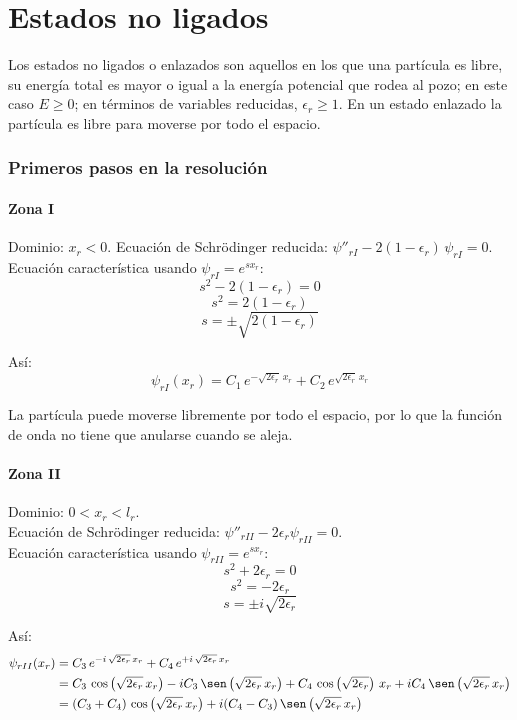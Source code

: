 
\chapter{Estados no ligados}
Los estados no ligados o enlazados son aquellos en los que una partícula
es libre, su energía total es mayor o igual a la energía potencial que rodea
al pozo; en este caso $E\ge 0$; en términos de variables reducidas, $\epsilon_r \ge 1$.
En un estado enlazado la partícula es libre para moverse por todo el espacio.

\subsection{Primeros pasos en la resolución}
\subsubsection{Zona I}
\noindent
Dominio: $x_r < 0$.
Ecuación de Schrödinger reducida:
$\psi''_{rI} - 2(1-\epsilon_r)\,\psi_{rI} = 0$.
Ecuación característica usando $\psi_{rI}=e^{sx_r}$:
\[
s^2-2(1-\epsilon_r)=0
\]
\[
s^2=2(1-\epsilon_r)
\]
\[
s = \pm\sqrt{2(1-\epsilon_r)}
\]

Así:
\[
\psi_{rI}(x_r)
 = C_1\,e^{-\sqrt{2\epsilon_r}\,x_r} + C_2\,e^{\sqrt{2\epsilon_r}\,x_r}
\]

La partícula puede moverse libremente por todo el espacio, por lo que la
función de onda no tiene que anularse cuando se aleja.

\subsubsection{Zona II}
\noindent
Dominio: $0 < x_r < l_r$.\\
Ecuación de Schrödinger reducida: $\psi''_{rII} - 2\epsilon_r\psi_{rII}= 0$.\\
Ecuación característica usando $\psi_{rII}=e^{sx_r}$:
\[
s^2+2\epsilon_r=0
\]
\[
s^2=-2\epsilon_r
\]
\[
s = \pm i\sqrt{2\epsilon_r}
\]

Así:
\begin{align*}
\psi_{rII}(x_r)
&=C_3\,e^{-i\,\sqrt{2\epsilon_r}\,x_r} + C_4\,e^{+i\,\sqrt{2\epsilon_r}\,x_r}\\
&=C_3\,\cos\left(\sqrt{2\epsilon_r}\,x_r\right)
 - i C_3\,\sen\left(\sqrt{2\epsilon_r}\,x_r\right)
 + C_4\,\cos\left(\sqrt{2\epsilon_r}\right)\,x_r 
 + i C_4\,\sen\left(\sqrt{2\epsilon_r}\,x_r\right)\\
&=(C_3+C_4)\,\cos\left(\sqrt{2\epsilon_r}\,x_r\right)
 + i (C_4-C_3)\,\sen\left(\sqrt{2\epsilon_r}\,x_r\right)
\end{align*}

